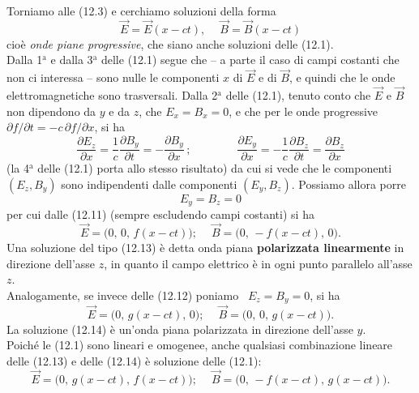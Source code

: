Torniamo alle (12.3) e cerchiamo soluzioni della forma
\begin{equation}
  \vec E=\vec E(x-ct),\quad\ \vec B=\vec B(x-ct)
  \tag{12.10}
\end{equation}
cio\`e \textit{onde piane progressive}, che siano anche soluzioni delle
(12.1).\\
Dalla 1$^\mathrm{a}$ e dalla 3$^\mathrm{a}$ delle (12.1) segue che -- a parte il
caso di campi costanti che non ci interessa -- sono nulle le componenti $x$ di
$\vec E$ e di $\vec B$, e quindi che le onde elettromagnetiche sono trasversali.
Dalla 2$^\mathrm{a}$ delle (12.1), tenuto conto che $\vec E$ e $\vec B$ non
dipendono da $y$ e da $z$, che $E_x=B_x=0$, e che per le onde progressive
\ $\partial f/\partial t=-c\,\partial f/\partial x$, si ha
\begin{equation}
  \frac{\partial E_z}{\partial x}=\frac{1}{c}\frac{\partial B_y}{\partial t}
  =-\frac{\partial B_y}{\partial x}\,;
  \qquad\qquad\frac{\partial E_y}{\partial x}
  =-\frac{1}{c}\frac{\partial B_z}{\partial t}=\frac{\partial B_z}{\partial x}
  \tag{12.11}
\end{equation}
(la 4$^\mathrm{a}$ delle (12.1) porta allo stesso risultato) da cui si vede che
le componenti $(E_z,B_y)$ sono indipendenti dalle componenti $(E_y,B_z)$.
Possiamo allora porre
\begin{equation}
  E_y=B_z=0
  \tag{12.12}
\end{equation}
per cui dalle (12.11) (sempre escludendo campi costanti) si ha
\begin{equation}
  \vec E=\big(0,\,0,\,f(x-ct)\big);\quad\ \vec B=\big(0,\,-f(x-ct),\,0\big).
  \tag{12.13}
\end{equation}
Una soluzione del tipo (12.13) \`e detta onda piana \textbf{polarizzata
linearmente} in direzione dell'asse $z$, in quanto il campo elettrico \`e in
ogni punto parallelo all'asse $z$.\\
Analogamente, se invece delle (12.12) poniamo \ $E_z=B_y=0$, si ha
\begin{equation}
  \vec E=\big(0,\,g(x-ct),\,0\big);\quad\ \vec B=\big(0,\,0,\,g(x-ct)\big).
  \tag{12.14}
\end{equation}
La soluzione (12.14) \`e un'onda piana polarizzata in direzione dell'asse $y$.\\
Poich\'e le (12.1) sono lineari e omogenee, anche qualsiasi combinazione lineare
delle (12.13) e delle (12.14) \`e soluzione delle (12.1):
\begin{equation}
  \vec E=\big(0,\,g(x-ct),\,f(x-ct)\big);
  \quad\ \vec B=\big(0,\,-f(x-ct),\,g(x-ct)\big).
  \tag{12.15}
\end{equation}
